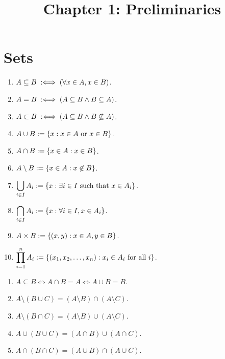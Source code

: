\documentclass[a4paper, 12pt, fleqn]{article}
\author{\empty}
\date{\empty}
\title{Chapter 1: Preliminaries}
\begin{document}
\maketitle
\setlength{\parskip}{0.2em}

\section{Sets}

\begin{definition}
\leavevmode
\begin{enumerate}
\item $A \subseteq B \;:\Longleftrightarrow\; (\forall x \in A, x \in B)$.
\item $A = B \;:\Longleftrightarrow\; (A \subseteq B \land B \subseteq A)$.
\item $A \subset B \;:\Longleftrightarrow\; (A \subseteq B \land B \not\subseteq A)$.
\item $A \cup B := \{x: x \in A \textrm{ or } x \in B\}$.
\item $A \cap B := \{x \in A: x \in B\}$.
\item $A \setminus B := \{x \in A: x \not\in B\}$.
\item $\displaystyle \bigcup_{i \in I} A_i := \{x: \exists i \in I \textrm{ such that } x \in A_i\}$.
\item $\displaystyle \bigcap_{i \in I} A_i := \{x: \forall i \in I, x \in A_i\}$.
\item $A \times B := \{(x, y): x \in A, y \in B\}$.
\item $\displaystyle \prod_{i=1}^n A_i := \{(x_1, x_2, \ldots, x_n): x_i \in A_i \textrm{ for all } i\}$.
\end{enumerate}
\end{definition}

\begin{theorem}
\begin{enumerate}
\item $A \subseteq B \iff A \cap B = A \iff A \cup B = B$.
\item $A \setminus (B \cup C) = (A \setminus B) \cap (A \setminus C)$.
\item $A \setminus (B \cap C) = (A \setminus B) \cup (A \setminus C)$.
\item $A \cup (B \cup C) = (A \cap B) \cup (A \cap C)$.
\item $A \cap (B \cap C) = (A \cup B) \cap (A \cup C)$.
\end{enumerate}
\end{theorem}
\end{document}
